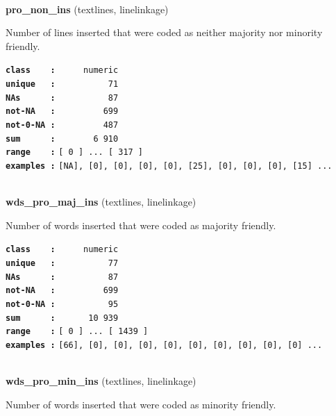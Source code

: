 \documentclass[]{article}
\begin{document}
~

\textbf{pro\_non\_ins} (textlines, linelinkage)

Number of lines inserted that were coded as neither majority nor
minority friendly.

\textbf{\texttt{class\ \ \ \ :}} \texttt{~~~~~numeric}\\
\textbf{\texttt{unique\ \ \ :}} \texttt{~~~~~~~~~~71}\\
\textbf{\texttt{NAs\ \ \ \ \ \ :}} \texttt{~~~~~~~~~~87}\\
\textbf{\texttt{not-NA\ \ \ :}} \texttt{~~~~~~~~~699}\\
\textbf{\texttt{not-0-NA\ :}} \texttt{~~~~~~~~~487}\\
\textbf{\texttt{sum\ \ \ \ \ \ :}} \texttt{~~~~~~~6~910}\\
\textbf{\texttt{range\ \ \ \ :}}
\texttt{{[}\ 0\ {]}\ ...\ {[}\ 317\ {]}}\\
\textbf{\texttt{examples\ :}}
\texttt{{[}NA{]},\ {[}0{]},\ {[}0{]},\ {[}0{]},\ {[}0{]},\ {[}25{]},\ {[}0{]},\ {[}0{]},\ {[}0{]},\ {[}15{]}\ ...}\\

~

\textbf{wds\_pro\_maj\_ins} (textlines, linelinkage)

Number of words inserted that were coded as majority friendly.

\textbf{\texttt{class\ \ \ \ :}} \texttt{~~~~~numeric}\\
\textbf{\texttt{unique\ \ \ :}} \texttt{~~~~~~~~~~77}\\
\textbf{\texttt{NAs\ \ \ \ \ \ :}} \texttt{~~~~~~~~~~87}\\
\textbf{\texttt{not-NA\ \ \ :}} \texttt{~~~~~~~~~699}\\
\textbf{\texttt{not-0-NA\ :}} \texttt{~~~~~~~~~~95}\\
\textbf{\texttt{sum\ \ \ \ \ \ :}} \texttt{~~~~~~10~939}\\
\textbf{\texttt{range\ \ \ \ :}}
\texttt{{[}\ 0\ {]}\ ...\ {[}\ 1439\ {]}}\\
\textbf{\texttt{examples\ :}}
\texttt{{[}66{]},\ {[}0{]},\ {[}0{]},\ {[}0{]},\ {[}0{]},\ {[}0{]},\ {[}0{]},\ {[}0{]},\ {[}0{]},\ {[}0{]}\ ...}\\

~

\textbf{wds\_pro\_min\_ins} (textlines, linelinkage)

Number of words inserted that were coded as minority friendly.
\end{document}
